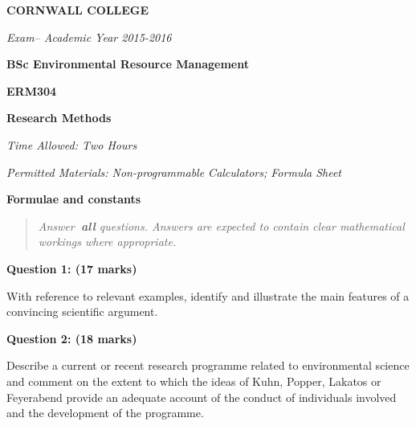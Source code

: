 \documentclass[a4paper,12pt,fleqn]{article}
\newcommand{\institution}{CORNWALL COLLEGE}
\newcommand{\titlehd}{BSc Environmental Resource Management}
\newcommand{\examtype}{Exam}
\newcommand{\examdate}{Academic Year 2015-2016}
\newcommand{\examcode}{ERM304}
\newcommand{\examtitle}{Research Methods}
\newcommand{\readtime}{15 Minutes}
\newcommand{\writetime}{Two Hours}
\newcommand{\materials}{Non-programmable Calculators; Formula Sheet}
\begin{document}

\begin{center}
\large\textbf{\institution}
\end{center}
\vspace{1cm}

\begin{center}
\textit{ \examtype -- \examdate}
\end{center}
\vspace{1cm}

\begin{center}
\large\textbf{\titlehd}
\end{center}

\begin{center}
\large\textbf{\examcode}
\end{center}
\begin{center}
\large\textbf{\examtitle}
\end{center}
\vspace{4cm}
\vspace{4cm}

\begin{center}
\end{center}
\begin{center}
\textit{Time Allowed:  \writetime}
\end{center}
\begin{center}
\textit{Permitted Materials: \materials}
\end{center}

\newpage
\textbf{Formulae and constants}


\newpage
\begin{quote}
\textit{Answer\textbf{\ all} questions.  Answers are expected to contain clear mathematical workings where appropriate.}
\end{quote}

\bigskip

\textbf{Question 1: (17 marks)}\newline

With reference to relevant examples, identify and illustrate the main features of a convincing scientific argument.

\vspace{1cm}

\textbf{Question 2: (18 marks)}\newline

Describe a current or recent research programme related to environmental science and comment on the extent to which the ideas of Kuhn, Popper, Lakatos or Feyerabend provide an adequate account of the conduct of individuals involved and the development of the programme. 
\end{document}

